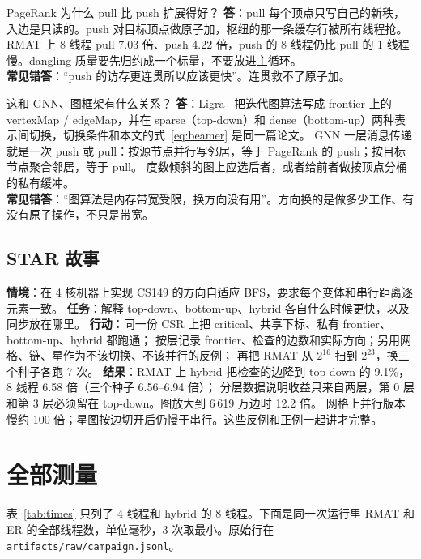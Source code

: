 \documentclass[11pt,a4paper]{ctexart}
\begin{document}
\begin{iqbox}{PageRank 为什么 pull 比 push 扩展得好？}
\textbf{答}：pull 每个顶点只写自己的新秩，入边是只读的。push 对目标顶点做原子加，枢纽的那一条缓存行被所有线程抢。
RMAT 上 8 线程 pull 7.03 倍、push 4.22 倍，push 的 8 线程仍比 pull 的 1 线程慢。dangling 质量要先归约成一个标量，不要放进主循环。\\
\textbf{常见错答}：``push 的访存更连贯所以应该更快''。连贯救不了原子加。
\end{iqbox}

\begin{iqbox}{这和 GNN、图框架有什么关系？}
\textbf{答}：Ligra~\cite{ligra} 把迭代图算法写成 frontier 上的 vertexMap / edgeMap，并在 sparse（top-down）和 dense（bottom-up）两种表示间切换，切换条件和本文的式~\eqref{eq:beamer} 是同一篇论文。
GNN 一层消息传递就是一次 push 或 pull：按源节点并行写邻居，等于 PageRank 的 push；按目标节点聚合邻居，等于 pull。
度数倾斜的图上应选后者，或者给前者做按顶点分桶的私有缓冲。\\
\textbf{常见错答}：``图算法是内存带宽受限，换方向没有用''。方向换的是做多少工作、有没有原子操作，不只是带宽。
\end{iqbox}

\subsection{STAR 故事}

\textbf{情境}：在 4 核机器上实现 CS149 的方向自适应 BFS，要求每个变体和串行距离逐元素一致。
\textbf{任务}：解释 top-down、bottom-up、hybrid 各自什么时候更快，以及同步放在哪里。
\textbf{行动}：同一份 CSR 上把 critical、共享下标、私有 frontier、bottom-up、hybrid 都跑通；
按层记录 frontier、检查的边数和实际方向；另用网格、链、星作为不该切换、不该并行的反例；
再把 RMAT 从 $2^{16}$ 扫到 $2^{23}$，换三个种子各跑 7 次。
\textbf{结果}：RMAT 上 hybrid 把检查的边降到 top-down 的 9.1\%，8 线程 6.58 倍（三个种子 6.56--6.94 倍）；
分层数据说明收益只来自两层，第 0 层和第 3 层必须留在 top-down。图放大到 6\,619 万边时 12.2 倍。
网格上并行版本慢约 100 倍；星图按边切开后仍慢于串行。这些反例和正例一起讲才完整。

\section{全部测量}
\label{sec:all}

表~\ref{tab:times} 只列了 4 线程和 hybrid 的 8 线程。下面是同一次运行里 RMAT 和 ER 的全部线程数，单位毫秒，3 次取最小。原始行在 \texttt{artifacts/raw/campaign.jsonl}。
\end{document}
